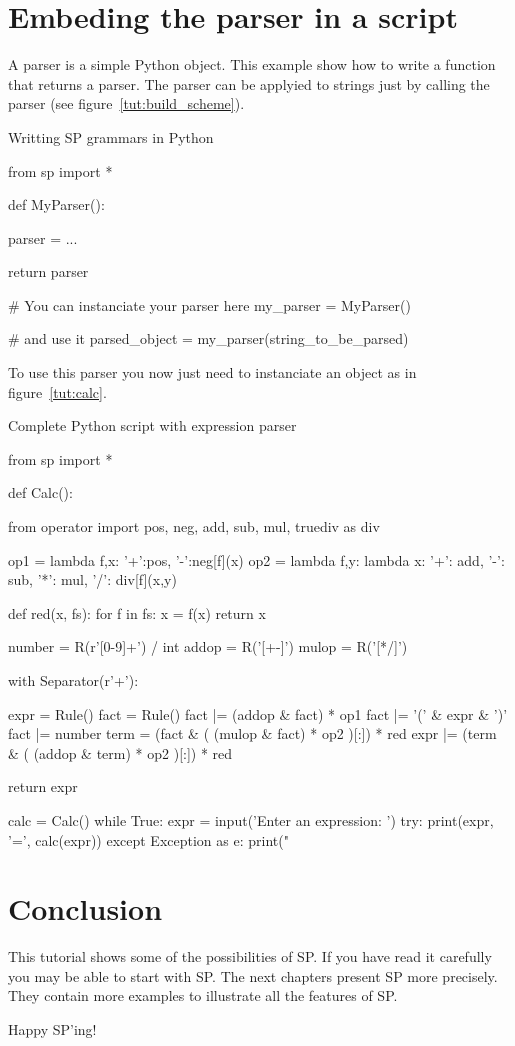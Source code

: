 \section{Embeding the parser in a script}

A parser is a simple Python object. This example show how to write a function that returns a parser. The parser can be applyied to strings just by calling the parser (see figure~\ref{tut:build_scheme}).

\begin{code}
\caption{Writting SP grammars in Python}             \label{tut:build_scheme}
\begin{verbatimtab}[4]
from sp import *

def MyParser():

    parser = ...

    return parser

# You can instanciate your parser here
my_parser = MyParser()

# and use it
parsed_object = my_parser(string_to_be_parsed)
\end{verbatimtab}
\end{code}

To use this parser you now just need to instanciate an object as in figure~\ref{tut:calc}.

\begin{code}
\caption{Complete Python script with expression parser}     \label{tut:calc}
\begin{verbatimtab}[4]
from sp import *

def Calc():

    from operator import pos, neg, add, sub, mul, truediv as div

    op1 = lambda f,x: {'+':pos, '-':neg}[f](x)
    op2 = lambda f,y: lambda x: {'+': add, '-': sub, '*': mul, '/': div}[f](x,y)

    def red(x, fs):
        for f in fs: x = f(x)
        return x

    number = R(r'[0-9]+') / int
    addop = R('[+-]')
    mulop = R('[*/]')

    with Separator(r'\s+'):

        expr = Rule()
        fact = Rule()
        fact |= (addop & fact) * op1
        fact |= '(' & expr & ')'
        fact |= number
        term = (fact & ( (mulop & fact) * op2 )[:]) * red
        expr |= (term & ( (addop & term) * op2 )[:]) * red

    return expr

calc = Calc()
while True:
    expr = input('Enter an expression: ')
    try: print(expr, '=', calc(expr))
    except Exception as e: print("%
\end{verbatimtab}
\end{code}

\clearpage

\section{Conclusion}

This tutorial shows some of the possibilities of SP.
If you have read it carefully you may be able to start with SP.
The next chapters present SP more precisely.
They contain more examples to illustrate all the features of SP.

Happy SP'ing!
